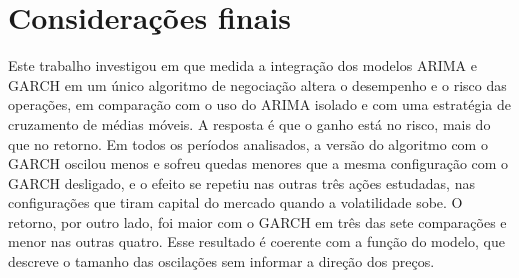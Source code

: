 %
%
\chapter*{Considerações finais}
{}

Este trabalho investigou em que medida a integração dos modelos ARIMA e GARCH em
um único algoritmo de negociação altera o desempenho e o risco das operações, em
comparação com o uso do ARIMA isolado e com uma estratégia de cruzamento de médias
móveis. A resposta é que o ganho está no risco, mais do que no retorno. Em todos
os períodos analisados, a versão do algoritmo com o GARCH oscilou menos e sofreu
quedas menores que a mesma configuração com o GARCH desligado, e o efeito se repetiu nas outras três ações estudadas, nas
configurações que tiram capital do mercado quando a volatilidade sobe. O retorno,
por outro lado, foi maior com o GARCH em três das sete comparações e menor nas
outras quatro. Esse resultado é coerente com a função do modelo, que descreve o
tamanho das oscilações sem informar a direção dos preços.

